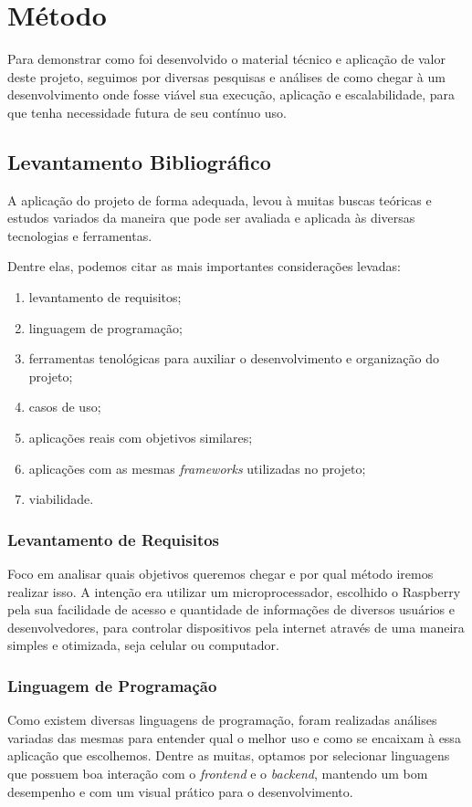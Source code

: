 \documentclass[../../layout.tex]{subfiles}
\begin{document}
\chapter{Método}
\hspace*{3em}Para demonstrar como foi desenvolvido o material técnico e aplicação de valor deste projeto, seguimos por diversas pesquisas e análises de como chegar à um desenvolvimento onde fosse viável sua execução, aplicação e escalabilidade, para que tenha necessidade futura de seu contínuo uso.
\section{Levantamento Bibliográfico}
\hspace*{3em}A aplicação do projeto de forma adequada, levou à muitas buscas teóricas e estudos variados da maneira que pode ser avaliada e aplicada às diversas tecnologias e ferramentas. \par
Dentre elas, podemos citar as mais importantes considerações levadas:

\begin{enumerate}[label=\alph*)]
\itemsep0em
    \item levantamento de requisitos;
    \item linguagem de programação;
    \item ferramentas tenológicas para auxiliar o desenvolvimento e organização do projeto;
    \item casos de uso;
    \item aplicações reais com objetivos similares;
    \item aplicações com as mesmas \emph{frameworks} utilizadas no projeto;
    \item viabilidade.
\end{enumerate}

\subsection{Levantamento de Requisitos}
\hspace*{3em}Foco em analisar quais objetivos queremos chegar e por qual método iremos realizar isso. A intenção era utilizar um microprocessador, escolhido o Raspberry pela sua facilidade de acesso e quantidade de informações de diversos usuários e desenvolvedores, para controlar dispositivos pela internet através de uma maneira simples e otimizada, seja celular ou computador.
\subsection{Linguagem de Programação}
\hspace*{3em}Como existem diversas linguagens de programação, foram realizadas análises variadas das mesmas para entender qual o melhor uso e como se encaixam à essa aplicação que escolhemos. Dentre as muitas, optamos por selecionar linguagens que possuem boa interação com o \emph{frontend} e o \emph{backend}, mantendo um bom desempenho e com um visual prático para o desenvolvimento.
\end{document}
